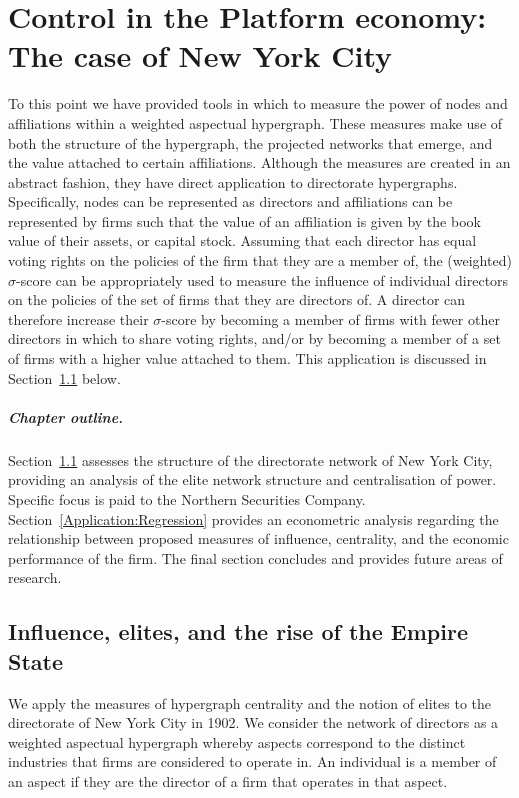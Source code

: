 \chapter{Control in the Platform economy: The case of New York City}
\label{ch:ControlInNYC}

To this point we have provided tools in which to measure the power of nodes and affiliations within a weighted aspectual hypergraph. These measures make use of both the structure of the hypergraph, the projected networks that emerge, and the value attached to certain affiliations. Although the measures are created in an abstract fashion, they have direct application to directorate hypergraphs. Specifically, nodes can be represented as directors and affiliations can be represented by firms such that the value of an affiliation is given by the book value of their assets, or capital stock. Assuming that each director has equal voting rights on the policies of the firm that they are a member of, the (weighted) $\sigma$-score can be appropriately used to measure the influence of individual directors on the policies of the set of firms that they are directors of. A director can therefore increase their $\sigma$-score by becoming a member of firms with fewer other directors in which to share voting rights, and/or by becoming a member of a set of firms with a higher value attached to them. This application is discussed in Section~\ref{Application:Network} below.

\paragraph{Chapter outline.}

Section~\ref{Application:Network} assesses the structure of the directorate network of New York City, providing an analysis of the elite network structure and centralisation of power. Specific focus is paid to the Northern Securities Company. Section~\ref{Application:Regression} provides an econometric analysis regarding the relationship between proposed measures of influence, centrality, and the economic performance of the firm. The final section concludes and provides future areas of research.

\section{Influence, elites, and the rise of the Empire State} \label{Application:Network}

We apply the measures of hypergraph centrality and the notion of elites to the directorate of New York City in 1902. We consider the network of directors as a weighted aspectual hypergraph whereby aspects correspond to the distinct industries that firms are considered to operate in. An individual is a member of an aspect if they are the director of a firm that operates in that aspect.

